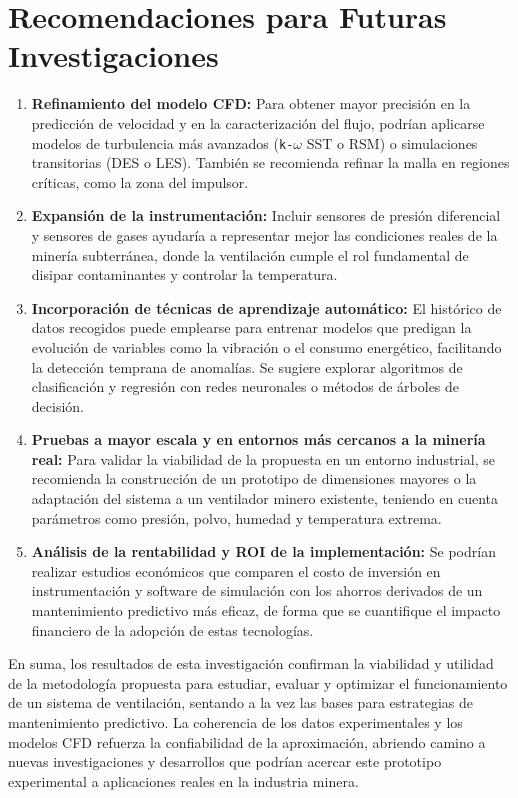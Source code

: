 \section{Recomendaciones para Futuras Investigaciones}
\begin{enumerate}
    \item \textbf{Refinamiento del modelo CFD:}  
    Para obtener mayor precisión en la predicción de velocidad y en la caracterización del flujo, podrían aplicarse modelos de turbulencia más avanzados (\texttt{k-$\omega$} SST o RSM) o simulaciones transitorias (DES o LES). También se recomienda refinar la malla en regiones críticas, como la zona del impulsor.

    \item \textbf{Expansión de la instrumentación:}  
    Incluir sensores de presión diferencial y sensores de gases ayudaría a representar mejor las condiciones reales de la minería subterránea, donde la ventilación cumple el rol fundamental de disipar contaminantes y controlar la temperatura.

    \item \textbf{Incorporación de técnicas de aprendizaje automático:}  
    El histórico de datos recogidos puede emplearse para entrenar modelos que predigan la evolución de variables como la vibración o el consumo energético, facilitando la detección temprana de anomalías. Se sugiere explorar algoritmos de clasificación y regresión con redes neuronales o métodos de árboles de decisión.

    \item \textbf{Pruebas a mayor escala y en entornos más cercanos a la minería real:}  
    Para validar la viabilidad de la propuesta en un entorno industrial, se recomienda la construcción de un prototipo de dimensiones mayores o la adaptación del sistema a un ventilador minero existente, teniendo en cuenta parámetros como presión, polvo, humedad y temperatura extrema.

    \item \textbf{Análisis de la rentabilidad y ROI de la implementación:}  
    Se podrían realizar estudios económicos que comparen el costo de inversión en instrumentación y software de simulación con los ahorros derivados de un mantenimiento predictivo más eficaz, de forma que se cuantifique el impacto financiero de la adopción de estas tecnologías.
\end{enumerate}

En suma, los resultados de esta investigación confirman la viabilidad y utilidad de la metodología propuesta para estudiar, evaluar y optimizar el funcionamiento de un sistema de ventilación, sentando a la vez las bases para estrategias de mantenimiento predictivo. La coherencia de los datos experimentales y los modelos CFD refuerza la confiabilidad de la aproximación, abriendo camino a nuevas investigaciones y desarrollos que podrían acercar este prototipo experimental a aplicaciones reales en la industria minera.

